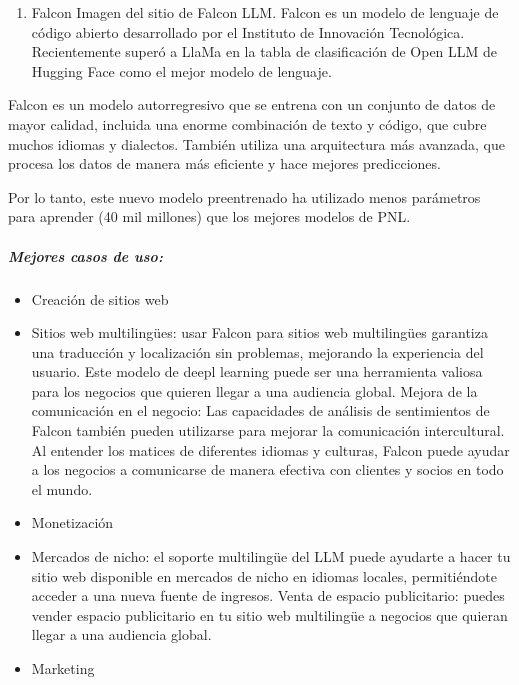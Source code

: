 \documentclass[a4paper12pt]{article}
\providecommand{\tightlist}{%
      \setlength{\itemsep}{0pt}\setlength{\parskip}{0pt}}
\begin{document}
\begin{enumerate}
\def\labelenumi{\arabic{enumi}.}
\setcounter{enumi}{4}
\tightlist
\item
  Falcon Imagen del sitio de Falcon LLM. Falcon es un modelo de lenguaje
  de código abierto desarrollado por el Instituto de Innovación
  Tecnológica. Recientemente superó a LlaMa en la tabla de clasificación
  de Open LLM de Hugging Face como el mejor modelo de lenguaje.
\end{enumerate}

Falcon es un modelo autorregresivo que se entrena con un conjunto de
datos de mayor calidad, incluida una enorme combinación de texto y
código, que cubre muchos idiomas y dialectos. También utiliza una
arquitectura más avanzada, que procesa los datos de manera más eficiente
y hace mejores predicciones.

Por lo tanto, este nuevo modelo preentrenado ha utilizado menos
parámetros para aprender (40 mil millones) que los mejores modelos de
PNL.

\hypertarget{mejores-casos-de-uso-4}{%
\subparagraph{Mejores casos de uso:}\label{mejores-casos-de-uso-4}}

\begin{itemize}
\item
  Creación de sitios web
\item
  Sitios web multilingües: usar Falcon para sitios web multilingües
  garantiza una traducción y localización sin problemas, mejorando la
  experiencia del usuario. Este modelo de deepl learning puede ser una
  herramienta valiosa para los negocios que quieren llegar a una
  audiencia global. Mejora de la comunicación en el negocio: Las
  capacidades de análisis de sentimientos de Falcon también pueden
  utilizarse para mejorar la comunicación intercultural. Al entender los
  matices de diferentes idiomas y culturas, Falcon puede ayudar a los
  negocios a comunicarse de manera efectiva con clientes y socios en
  todo el mundo.
\item
  Monetización
\item
  Mercados de nicho: el soporte multilingüe del LLM puede ayudarte a
  hacer tu sitio web disponible en mercados de nicho en idiomas locales,
  permitiéndote acceder a una nueva fuente de ingresos. Venta de espacio
  publicitario: puedes vender espacio publicitario en tu sitio web
  multilingüe a negocios que quieran llegar a una audiencia global.
\item
  Marketing
\end{itemize}
\end{document}
